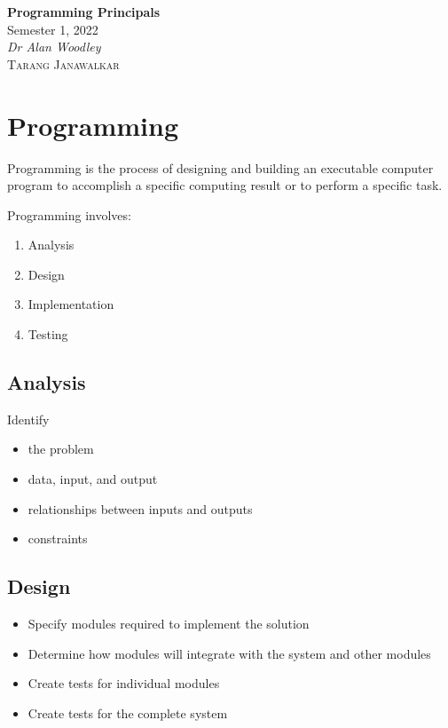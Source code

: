 \documentclass{article}
\date{}
\newcommand\emptyaccsupp[1]{\BeginAccSupp{ActualText={}}#1\EndAccSupp{}}
\newcommand{\unitName}{Programming Principals}
\newcommand{\unitTime}{Semester 1, 2022}
\newcommand{\unitCoordinator}{Dr Alan Woodley}
\newcommand{\documentAuthors}{\textsc{Tarang Janawalkar}}
\begin{document}
%
\begin{titlepage}
    \vspace*{\fill}
    \begin{center}
        \LARGE{\textbf{\unitName}} \\[0.1in]
        \normalsize{\unitTime} \\[0.2in]
        \normalsize\textit{\unitCoordinator} \\[0.2in]
        \documentAuthors
    \end{center}
    \vspace*{\fill}
    \doclicenseThis
    \thispagestyle{empty}
\end{titlepage}
\newpage
%
\tableofcontents
\newpage
%
\lstset{language=[Sharp]C}
\lstset{numbers=left, firstnumber=1, numberstyle=\ttfamily\emptyaccsupp}
\section{Programming}
\begin{definition}
    Programming is the process of designing and building an executable
    computer program to accomplish a specific computing result or to
    perform a specific task.
\end{definition}
Programming involves:
\begin{enumerate}
    \item Analysis
    \item Design
    \item Implementation
    \item Testing
\end{enumerate}
\subsection{Analysis}
Identify
\begin{itemize}
    \item the problem
    \item data, input, and output
    \item relationships between inputs and outputs
    \item constraints
\end{itemize}
\subsection{Design}
\begin{itemize}
    \item Specify modules required to implement the solution
    \item Determine how modules will integrate with the system and other modules
    \item Create tests for individual modules
    \item Create tests for the complete system
\end{itemize}
\end{document}
